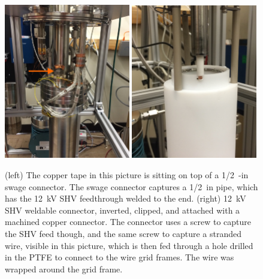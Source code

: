 \begin{figure}[htbp]
\begin{center}
\includegraphics[width=0.49\textwidth]{figures/testbed/ft1_2.jpg}
\includegraphics[width=0.49\textwidth]{figures/testbed/ft1_1.jpg}
\caption{(left) The copper tape in this picture is sitting on top of a 1/2~-in swage connector. The swage connector captures a 1/2~in pipe, which has the 12~kV SHV feedthrough welded to the end. (right) 12~kV SHV weldable connector, inverted, clipped, and attached with a machined copper connector. The connector uses a screw to capture the SHV feed though, and the same screw to capture a stranded wire, visible in this picture, which is then fed through a hole drilled in the PTFE to connect to the wire grid frames. The wire was wrapped around the grid frame. }
\label{fig:ft1}
\end{center}
\end{figure}


